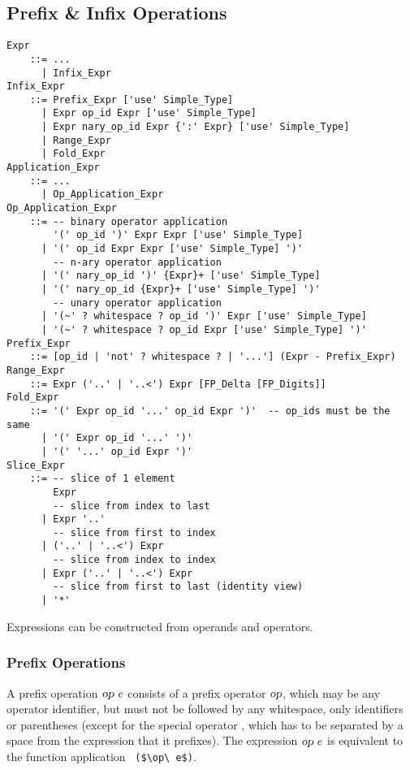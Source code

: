 \subsection{Prefix \& Infix Operations}
\label{sec:prefix-infix-ops}

\grammar\begin{lstlisting}
Expr
    ::= ...
      | Infix_Expr
Infix_Expr 
    ::= Prefix_Expr ['use' Simple_Type]
      | Expr op_id Expr ['use' Simple_Type]
      | Expr nary_op_id Expr {':' Expr} ['use' Simple_Type] 
      | Range_Expr
      | Fold_Expr
Application_Expr
    ::= ...
      | Op_Application_Expr
Op_Application_Expr
    ::= -- binary operator application
        '(' op_id ')' Expr Expr ['use' Simple_Type]
      | '(' op_id Expr Expr ['use' Simple_Type] ')'
        -- n-ary operator application
      | '(' nary_op_id ')' {Expr}+ ['use' Simple_Type]
      | '(' nary_op_id {Expr}+ ['use' Simple_Type] ')'
        -- unary operator application
      | '(~' ? whitespace ? op_id ')' Expr ['use' Simple_Type]
      | '(~' ? whitespace ? op_id Expr ['use' Simple_Type] ')'
Prefix_Expr 
    ::= [op_id | 'not' ? whitespace ? | '...'] (Expr - Prefix_Expr)
Range_Expr
    ::= Expr ('..' | '..<') Expr [FP_Delta [FP_Digits]]
Fold_Expr
    ::= '(' Expr op_id '...' op_id Expr ')'  -- op_ids must be the same
      | '(' Expr op_id '...' ')'
      | '(' '...' op_id Expr ')'
Slice_Expr
    ::= -- slice of 1 element
        Expr 
        -- slice from index to last
      | Expr '..'
        -- slice from first to index
      | ('..' | '..<') Expr
        -- slice from index to index
      | Expr ('..' | '..<') Expr
        -- slice from first to last (identity view)
      | '*'
\end{lstlisting}

Expressions can be constructed from operands and operators. 





\subsubsection{Prefix Operations}

A prefix operation $\mbox{\sl op}\ e$ consists of a prefix operator $\mbox{\sl op}$, which may be any operator identifier, but must not be followed by any whitespace, only identifiers or parentheses (except for the special operator , which has to be separated by a space from the expression that it prefixes). The expression $\mbox{\sl op}\ e$ is equivalent to the function application ~\lstinline!($\op\ e$)!.

